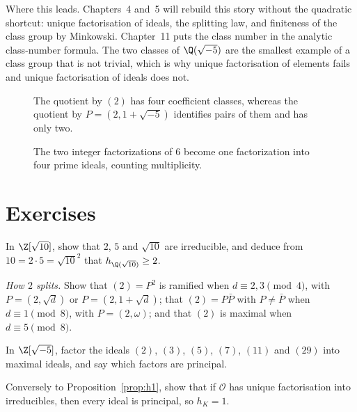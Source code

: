 \begin{beauty}
Where this leads. Chapters~4 and~5 will rebuild this story without the quadratic shortcut: unique factorisation of ideals, the splitting law, and finiteness of the class group by Minkowski. Chapter~11 puts the class number in the analytic class-number formula. The two classes of $\Q(\sqrt{-5})$ are the smallest example of a class group that is not trivial, which is why unique factorisation of elements fails and unique factorisation of ideals does not.
\end{beauty}

\begin{figure}[ht]
\centering
{}
\caption{The quotient by $(2)$ has four coefficient classes, whereas the quotient by $P=(2,1+\sqrt{-5})$ identifies pairs of them and has only two.}
\label{fig:v13-extra-02-a}
\end{figure}

\begin{figure}[ht]
\centering
{}
\caption{The two integer factorizations of $6$ become one factorization into four prime ideals, counting multiplicity.}
\label{fig:v13-extra-02-b}
\end{figure}

\section{Exercises}

\begin{exercise}[$\star\star$]\label{ex:quadsqrt10}
In $\Z[\sqrt{10}]$, show that $2$, $5$ and $\sqrt{10}$ are irreducible, and deduce from $10=2\cdot5=\sqrt{10}^2$ that $h_{\Q(\sqrt{10})}\ge2$.
\end{exercise}

\begin{exercise}[$\star\star$]\label{ex:two}
\emph{How $2$ splits.} Show that $(2)=P^2$ is ramified when $d\equiv2,3\pmod4$, with $P=(2,\sqrt d)$ or $P=(2,1+\sqrt d)$; that $(2)=P\bar P$ with $P\ne\bar P$ when $d\equiv1\pmod8$, with $P=(2,\omega)$; and that $(2)$ is maximal when $d\equiv5\pmod8$.
\end{exercise}

\begin{exercise}[$\star\star$]\label{ex:factor5}
In $\Z[\sqrt{-5}]$, factor the ideals $(2)$, $(3)$, $(5)$, $(7)$, $(11)$ and $(29)$ into maximal ideals, and say which factors are principal.
\end{exercise}

\begin{exercise}[$\star\star$]\label{ex:ufdh1}
Conversely to Proposition~\ref{prop:h1}, show that if $\mathcal O$ has unique factorisation into irreducibles, then every ideal is principal, so $h_K=1$.
\end{exercise}

